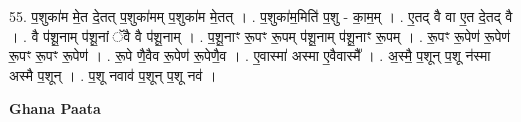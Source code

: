\documentclass[17pt]{extarticle}
\begin{document}
55. प॒शुका॑म मे॒त दे॒तत् प॒शुका॑मम् प॒शुका॑म मे॒तत् । . प॒शुका॑म॒मिति॑ प॒शु - का॒म॒म् । . ए॒तद् वै वा ए॒त दे॒तद् वै । . वै प॑शू॒नाम् प॑शू॒नां ॅवै वै प॑शू॒नाम् । . प॒शू॒नाꣳ रू॒पꣳ रू॒पम् प॑शू॒नाम् प॑शू॒नाꣳ रू॒पम् । . रू॒पꣳ रू॒पेण॑ रू॒पेण॑ रू॒पꣳ रू॒पꣳ रू॒पेण॑ । . रू॒पे णै॒वैव रू॒पेण॑ रू॒पेणै॒व । . ए॒वास्मा॑ अस्मा ए॒वैवास्मै᳚ । . अ॒स्मै॒ प॒शून् प॒शू न॑स्मा अस्मै प॒शून् । . प॒शू नवाव॑ प॒शून् प॒शू नव॑ । \newline

\textbf{Ghana Paata } \newline
\end{document}
